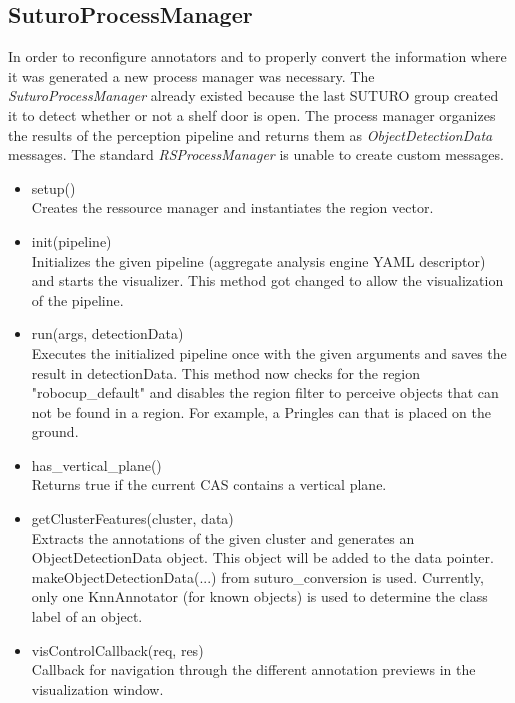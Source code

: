 \documentclass[main.tex]{subfiles}
\begin{document}
\subsection{SuturoProcessManager}
In order to reconfigure annotators and to properly convert the information where it was generated a new process manager was necessary.
The \textit{SuturoProcessManager} already existed because the last SUTURO group created it to detect whether or not a shelf door is open.
The process manager organizes the results of the perception pipeline and returns them as \textit{ObjectDetectionData} messages.
The standard \textit{RSProcessManager} is unable to create custom messages.

\begin{itemize}
\item setup()\\
Creates the ressource manager and instantiates the region vector.

\item init(pipeline)\\
Initializes the given pipeline (aggregate analysis engine YAML descriptor) and starts the visualizer.
This method got changed to allow the visualization of the pipeline.

\item run(args, detectionData)\\
Executes the initialized pipeline once with the given arguments and saves the result in detectionData.
This method now checks for the region "robocup\_default" and disables the region filter to perceive objects that can not be found
in a region. For example, a Pringles can that is placed on the ground.

\item has\_vertical\_plane()\\
Returns true if the current CAS contains a vertical plane.

\item getClusterFeatures(cluster, data)\\
Extracts the annotations of the given cluster and generates an ObjectDetectionData object. 
This object will be added to the data pointer. makeObjectDetectionData(...) from suturo\_conversion is used.
Currently, only one KnnAnnotator (for known objects) is used to determine the class label of an object.

\item visControlCallback(req, res)\\
Callback for navigation through the different annotation previews in the visualization window.
\end{itemize}
\end{document}
